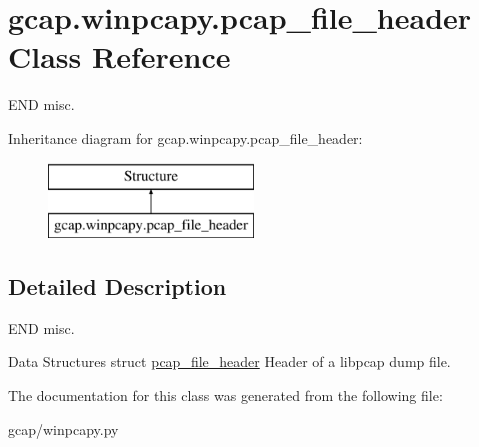 \hypertarget{classgcap_1_1winpcapy_1_1pcap__file__header}{}\section{gcap.\+winpcapy.\+pcap\+\_\+file\+\_\+header Class Reference}
\label{classgcap_1_1winpcapy_1_1pcap__file__header}


E\+ND misc.  


Inheritance diagram for gcap.\+winpcapy.\+pcap\+\_\+file\+\_\+header\+:\begin{figure}[H]
\begin{center}
\leavevmode
\includegraphics[height=2.000000cm]{d2/def/classgcap_1_1winpcapy_1_1pcap__file__header}
\end{center}
\end{figure}


\subsection{Detailed Description}
E\+ND misc. 

Data Structures struct \hyperlink{classgcap_1_1winpcapy_1_1pcap__file__header}{pcap\+\_\+file\+\_\+header} Header of a libpcap dump file. 

The documentation for this class was generated from the following file\+:\begin{DoxyCompactItemize}
\item 
gcap/winpcapy.\+py\end{DoxyCompactItemize}
